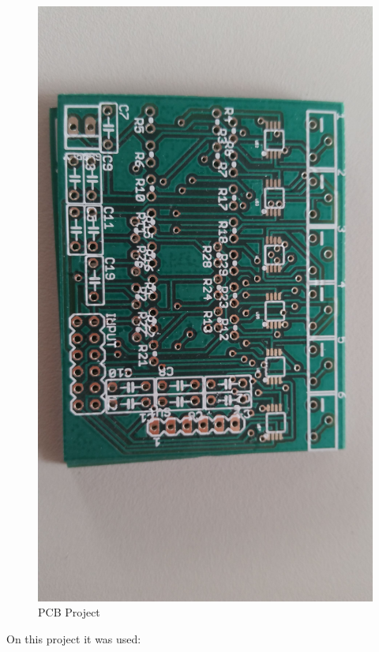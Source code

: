 \begin{figure}[!htpb]
\centering
\caption{PCB Project}
\label{PCB}
\includegraphics[scale=0.08]{images/INA_board}
\end{figure}

On this project it was used:
\\
\\

